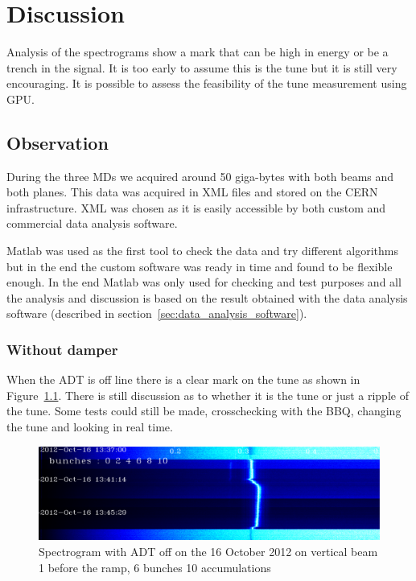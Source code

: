 
\chapter{Discussion}

Analysis of the spectrograms show a mark that can be high in energy or be a trench in the signal. It is too early to assume this is the \gls{tune} but it is still very encouraging. It is possible to assess the feasibility of the tune measurement using \gls{GPU}.

\section{Observation}

During the three \glspl{MD} we acquired around 50 giga-bytes with both beams and both planes. This data was acquired in XML files and stored on the \gls{CERN} infrastructure. XML was chosen as it is easily accessible by both custom and commercial data analysis software.

Matlab was used as the first tool to check the data and try different algorithms but in the end the custom software was ready in time and found to be flexible enough. In the end Matlab was only used for checking and test purposes and all the analysis and discussion is based on the result obtained with the data analysis software (described in section~\ref{sec:data_analysis_software}).

\subsection{Without damper}

When the \gls{ADT} is off line there is a clear mark on the tune as shown in Figure~\ref{fig:adt_off}. There is still discussion as to whether it is the tune or just a ripple of the tune. Some tests could still be made, crosschecking with the \gls{BBQ}, changing the tune and looking in real time.

\begin{figure}[H]
\caption{Spectrogram with ADT off on the 16 October 2012 on vertical beam 1 before the ramp, 6 bunches 10 accumulations}
\label{fig:adt_off}
\centering
\includegraphics[scale=0.3]{md-121016-vb1-m1-6bunches-10acc-1337-1349-ADT-off.pdf}
\end{figure}

